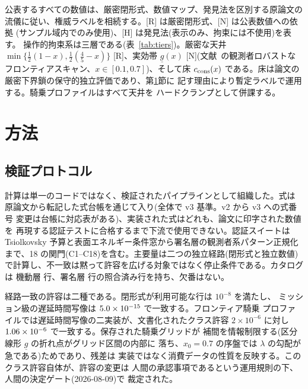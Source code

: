 \documentclass[11pt]{article}
\begin{document}
公表するすべての数値は、厳密閉形式、数値マップ、発見法を区別する原論文の
流儀に従い、権威ラベルを相続する。[R] は厳密閉形式、[N] は公表数値への依拠
(サンプル域内でのみ使用)、[H] は発見法(表示のみ、拘束には不使用)を表す。
操作的拘束系は三層である(表~\ref{tab:tiers})。厳密な天井
$\min\{\tfrac12(1-x), \tfrac12(\tfrac45 - x)\}$ [R]、実効帯
$\underline{g}(x)$ [N](文献~\cite{le-steering}の観測者ロバストな
フロンティアスキャン、$x \in [0.1, 0.7]$)、そして床 $c_{\rm cons}(x)$
である。床は論文の厳密下界鎖の保守的独立評価であり、第\ref{sec:methods}節に
記す理由により暫定ラベルで運用する。騎乗プロファイルはすべて天井を
ハードクランプとして併課する。

\begin{table}[t]
\centering
\caption{$\lambda = aR$ に対する三層拘束系。}
\label{tab:tiers}

\end{table}

\section{方法}\label{sec:methods}

\subsection{検証プロトコル}

計算は単一のコードではなく、検証されたパイプラインとして組織した。式は
原論文から転記した式台帳を通じて入り(全体で v3 基準。v2 から v3 への式番号
変更は台帳に対応表がある)、実装された式はどれも、論文に印字された数値を
再現する認証テストに合格するまで下流で使用できない。認証スイートは
Tsiolkovsky 予算と表面エネルギー条件窓から署名層の観測者系パターン正規化
まで、18 の関門(C1--C18)を含む。主要量は二つの独立経路(閉形式と独立数値)
で計算し、不一致は黙って許容を広げる対象ではなく停止条件である。カタログは
機動層 \NmGRowsP{} 行、署名層 \NmSigRows{} 行の照合済み行を持ち、欠番はない。

経路一致の許容は二種である。閉形式が利用可能な行は $10^{-8}$ を満たし、
ミッション級の遅延時間写像は $5.0\times10^{-15}$ で一致する。フロンティア騎乗
プロファイルでは遅延時間写像の二実装が、文書化されたクラス許容
$2\times10^{-6}$ に対し $1.06\times10^{-6}$ で一致する。保存された騎乗グリッドが
補間を情報制限する(区分線形 $\underline{g}$ の折れ点がグリッド区間の内部に
落ち、$x_0=0.7$ の序盤では $\lambda$ の勾配が急である)ためであり、残差は
実装ではなく消費データの性質を反映する。このクラス許容自体が、許容の変更は
人間の承認事項であるという運用規則の下、人間の決定ゲート(2026-08-09)で
裁定された。
\end{document}

